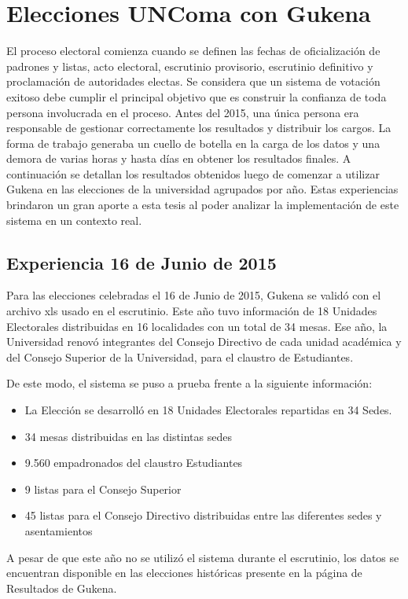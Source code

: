 \chapter{Elecciones UNComa con Gukena}
\label{Gukena2}
El proceso electoral comienza cuando se definen las fechas de oficialización de padrones y listas, acto electoral, escrutinio provisorio, escrutinio definitivo y proclamación de autoridades electas. Se considera que un sistema de votación exitoso debe cumplir el principal objetivo que es construir la confianza de toda persona involucrada en el proceso. 
Antes del 2015, una única persona era responsable de gestionar correctamente los resultados y distribuir los cargos. La forma de trabajo generaba un cuello de botella en la carga de los datos y una demora de varias horas y hasta días en obtener los resultados finales. \newline
A continuación se detallan los resultados obtenidos luego de comenzar a utilizar Gukena en las elecciones de la universidad agrupados por año. Estas experiencias brindaron un gran aporte a esta tesis al poder analizar la implementación de este sistema en un contexto real.

\section{Experiencia 16 de Junio de 2015}
Para las elecciones celebradas el 16 de Junio de 2015, Gukena se validó con el archivo xls usado en el escrutinio. Este año tuvo información de 18 Unidades Electorales distribuidas en 16 localidades con un total de 34 mesas. 
Ese año, la Universidad renovó integrantes del Consejo Directivo de cada unidad académica y del Consejo Superior de la Universidad, para el claustro de Estudiantes.

De este modo, el sistema se puso a prueba frente a la siguiente información:
\begin{itemize}
    \item La Elección se desarrolló en 18 Unidades Electorales repartidas en 34 Sedes.
    \item 34 mesas distribuidas en las distintas sedes
    \item 9.560 empadronados del claustro Estudiantes
    \item 9 listas para el Consejo Superior
    \item 45 listas para el Consejo Directivo distribuidas entre las diferentes sedes y asentamientos
\end{itemize}
A pesar de que este año no se utilizó el sistema durante el escrutinio, los datos se encuentran disponible en las elecciones históricas presente en la página de Resultados de Gukena.

